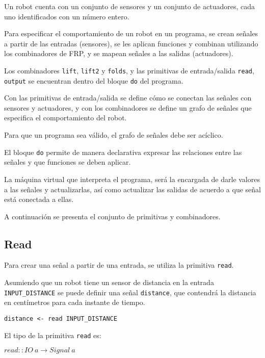 
  Un robot cuenta con un conjunto de sensores y un conjunto de actuadores,
cada uno identificados con un número entero.

  Para especificar el comportamiento de un robot en un programa, se crean
señales a partir de las entradas (sensores), se les aplican funciones
y combinan utilizando los combinadores de FRP, y se mapean señales
a las salidas (actuadores).

  Los combinadores \texttt{lift}, \texttt{lift2} y \texttt{folds},
y las primitivas de entrada/salida \texttt{read}, \texttt{output} se
encuentran dentro del bloque \texttt{do} del programa.

  Con las primitivas de entrada/salida se define cómo se conectan
las señales con sensores y actuadores, y con los combinadores se
define un grafo de señales que especifica el comportamiento del robot.
  
  Para que un programa sea válido, el grafo de señales debe ser acíclico.

  El bloque \texttt{do} permite de manera declarativa expresar las
relaciones entre las señales y que funciones se deben aplicar.

  La máquina virtual que interpreta el programa, será la encargada de
darle valores a las señales y actualizarlas, así como actualizar las
salidas de acuerdo a que señal está conectada a ellas.

  A continuación se presenta el conjunto de primitivas y combinadores.

\subsection{Read}
  Para crear una señal a partir de una entrada, se utiliza la
primitiva \texttt{read}.

  Asumiendo que un robot tiene un sensor de distancia en la entrada
\texttt{INPUT\_DISTANCE} se puede definir una señal \texttt{distance},
que contendrá la distancia en centímetros para cada instante de tiempo.

\begin{center}
\begin{Verbatim}[frame=single]
distance <- read INPUT_DISTANCE
\end{Verbatim}
\end{center}

El tipo de la primitiva \texttt{read} es:

\begin{center}
  $read :: IO\ a \rightarrow Signal\ a $
\end{center}

